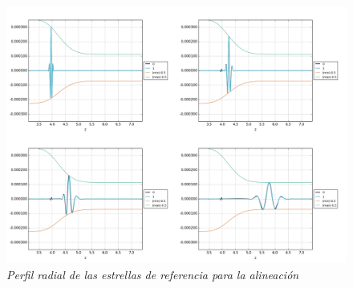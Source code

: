 \documentclass{article}
\begin{document}
\begin{description}
\begin{figure}[!ht]
 \centering
 \includegraphics[scale=0.2]{rhocInhom1.png}
 \caption{\emph{Perfil radial de las estrellas de referencia para la alineación}}
\end{figure}
 
\end{description}
\end{document}
